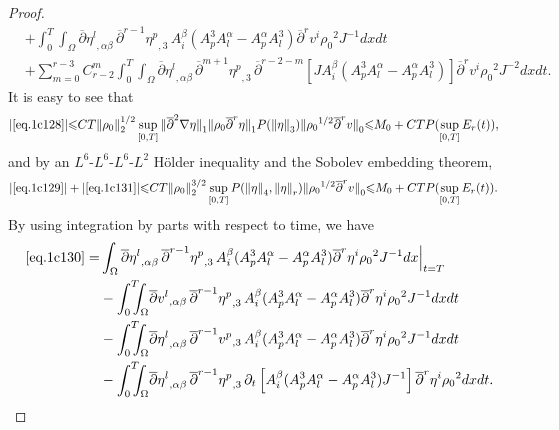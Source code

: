 \documentclass[12pt,twoside,reqno]{amsart}
\numberwithin{equation}{section}
\theoremstyle{definition}
\theoremstyle{remark}
\begin{document}
\begin{proof}
\begin{align}
  &+{\int_0^T\!\!\!\!\int_\Omega }  {\overline{\partial}} {{{\eta^l}}_{,{\alpha\beta}}\,}{{{{\overline{\partial}}^{r-1}\eta^p}}_{,{3}}\,} A^\beta_i(A^3_pA^\alpha_l-A^\alpha_pA^3_l) {\overline{\partial}}^r v^i{\rho_0}^2  J^{-1}dxdt\label{eq.1c130}\\
  &+\sum_{m=0}^{r-3}C_{r-2}^m{\int_0^T\!\!\!\!\int_\Omega }  {\overline{\partial}} {{{\eta^l}}_{,{\alpha\beta}}\,}{{{{\overline{\partial}}^{m+1}\eta^p}}_{,{3}}\,}{\overline{\partial}}^{r-2-m}\left[J A^\beta_i(A^3_pA^\alpha_l-A^\alpha_pA^3_l)\right] {\overline{\partial}}^r v^i{\rho_0}^2  J^{-2}dxdt.\label{eq.1c131}
\end{align}
It is easy to see that
\begin{align*}
  {\vert{\eqref{eq.1c128}}\vert}{\leqslant} &CT{\Vert{\rho_0}\Vert}_2^{1/2}\sup_{[0,T]}{\Vert{{\overline{\partial}}^2{\nabla}\eta}\Vert}_1 {\Vert{{\rho_0} {\overline{\partial}}^r\eta}\Vert}_1P({\Vert{\eta}\Vert}_3) {\Vert{{\rho_0}^{1/2}{\overline{\partial}}^rv}\Vert}_0
  {\leqslant} M_0+CTP(\sup_{[0,T]}E_r(t)),
\end{align*}
and by an $L^6$-$L^6$-$L^6$-$L^2$ H\"older inequality and the Sobolev embedding theorem,
\begin{align*}
  {\vert{\eqref{eq.1c129}}\vert}+{\vert{\eqref{eq.1c131}}\vert}{\leqslant} &CT{\Vert{\rho_0}\Vert}_2^{3/2}\sup_{[0,T]}P({\Vert{\eta}\Vert}_4,{\Vert{\eta}\Vert}_r){\Vert{{\rho_0}^{1/2}{\overline{\partial}}^r v}\Vert}_0
  {\leqslant} M_0+CTP(\sup_{[0,T]}E_r(t)).
\end{align*}
By using integration by parts with respect to time, we have
\begin{align}
  \eqref{eq.1c130}=&\int_\Omega {\overline{\partial}} {{{\eta^l}}_{,{\alpha\beta}}\,}{{{{\overline{\partial}}^{r-1}\eta^p}}_{,{3}}\,} A^\beta_i(A^3_pA^\alpha_l-A^\alpha_pA^3_l) {\overline{\partial}}^r \eta^i{\rho_0}^2  J^{-1}dx\Big|_{t=T}\label{eq.1c132}\\
  &-{\int_0^T\!\!\!\!\int_\Omega }  {\overline{\partial}} {{{v^l}}_{,{\alpha\beta}}\,}{{{{\overline{\partial}}^{r-1}\eta^p}}_{,{3}}\,} A^\beta_i(A^3_pA^\alpha_l-A^\alpha_pA^3_l) {\overline{\partial}}^r \eta^i{\rho_0}^2  J^{-1}dxdt\label{eq.1c133}\\
  &-{\int_0^T\!\!\!\!\int_\Omega }  {\overline{\partial}} {{{\eta^l}}_{,{\alpha\beta}}\,}{{{{\overline{\partial}}^{r-1}v^p}}_{,{3}}\,} A^\beta_i(A^3_pA^\alpha_l-A^\alpha_pA^3_l) {\overline{\partial}}^r \eta^i{\rho_0}^2  J^{-1}dxdt\label{eq.1c134}\\
  &-{\int_0^T\!\!\!\!\int_\Omega }  {\overline{\partial}} {{{\eta^l}}_{,{\alpha\beta}}\,}{{{{\overline{\partial}}^{r-1}\eta^p}}_{,{3}}\,} {\partial}_t\left[A^\beta_i(A^3_pA^\alpha_l-A^\alpha_pA^3_l)J^{-1}\right] {\overline{\partial}}^r \eta^i{\rho_0}^2  dxdt.\label{eq.1c135}

\end{align}
\end{proof}
\end{document}
